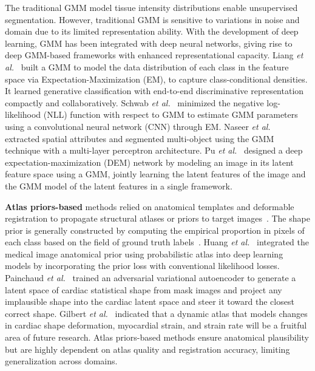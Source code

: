 \documentclass[preprint,12pt]{elsarticle}
\begin{document}
%
The traditional GMM model tissue intensity distributions enable unsupervised segmentation.
However, traditional GMM is sensitive to variations in noise and domain due to its limited representation ability. 
With the development of deep learning, GMM has been integrated with deep neural networks, giving rise to deep GMM-based frameworks with enhanced representational capacity.
Liang \textit{et al.}~\cite{liang2022gmmseg} built a GMM to model the data distribution of each class in the feature space via Expectation-Maximization (EM), to capture class-conditional densities. It learned generative classification with end-to-end discriminative representation compactly and collaboratively. 
%
Schwab \textit{et al.}~\cite{deepGMM} minimized the negative log-likelihood (NLL) function with respect to GMM to estimate GMM parameters using a convolutional neural network (CNN) through EM. 
%
Naseer \textit{et al.}~\cite{naseer2024multimodal} extracted spatial attributes and segmented multi-object using the GMM technique with a multi-layer perceptron architecture. 
%
Pu \textit{et al.}~\cite{pu2023deep} designed a deep expectation-maximization (DEM) network by modeling an image in its latent feature space using a GMM, jointly learning the latent features of the image and the GMM model of the latent features in a single framework. 

%
\textbf{Atlas priors-based} methods relied on anatomical templates and deformable registration to propagate structural atlases or priors to target images~\cite{zhou2017cardiac,milo2022atlas,finnegan2023open,chin2023validation}. 
% 
%
The shape prior is generally constructed by computing the empirical proportion in pixels of each class based on the field of ground truth labels~\cite{zotti2018convolutional,li2021semi}.
%
Huang \textit{et al.}~\cite{huang2021medical} integrated the medical image anatomical prior using probabilistic atlas into deep learning models by incorporating the prior loss with conventional likelihood losses.
%
Painchaud \textit{et al.}~\cite{painchaud2020cardiac} trained an adversarial variational autoencoder to generate a latent space of cardiac statistical shape from mask images and project any implausible shape into
the cardiac latent space and steer it toward the closest correct shape.
Gilbert \textit{et al.}~\cite{gilbert2020artificial} indicated that a dynamic atlas that models changes in cardiac shape deformation, myocardial strain, and strain rate will be a fruitful area of future research. 
%
Atlas priors-based methods ensure anatomical plausibility but are highly dependent on atlas quality and registration accuracy, limiting generalization across domains.
\end{document}
